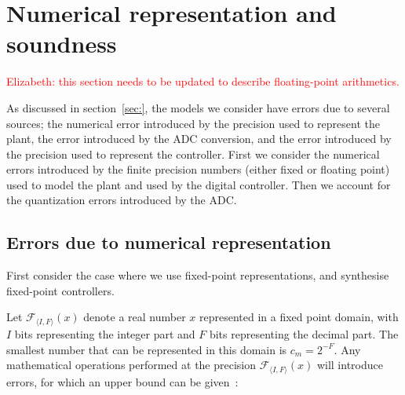 \documentclass[twocolumn]{autart}    %
\begin{document}
\section{Numerical representation and soundness} 
\label{sec:numeric_rep}

\textcolor{red}{Elizabeth: this section needs to be updated to describe floating-point arithmetics.}

As discussed in section~\ref{sec:}, the models we consider have errors due to several sources; the numerical error introduced by the precision used to represent the plant, the error introduced by the ADC conversion, and the error introduced by the precision used to represent the controller. First we consider the numerical errors introduced by the finite precision numbers (either fixed or floating point) used to model the plant and used by the digital controller. Then we account for the quantization errors introduced by the ADC.

\subsection{Errors due to numerical representation}
First consider the case where we use fixed-point representations, and synthesise fixed-point controllers. 

Let $\mathcal{F}_{\langle I,F \rangle}(x)$ denote a real number $x$
represented in a fixed point domain, with $I$ bits representing the integer
part and $F$ bits representing the decimal part.  The smallest number that
can be represented in this domain is $c_m=2^{-F}$.  Any mathematical
operations performed at the precision $\mathcal{F}_{\langle I,F \rangle}(x)$
will introduce errors, for which an upper bound can be
given~\cite{DBLP:conf/arith/BrainTRW15}:
\end{document}
